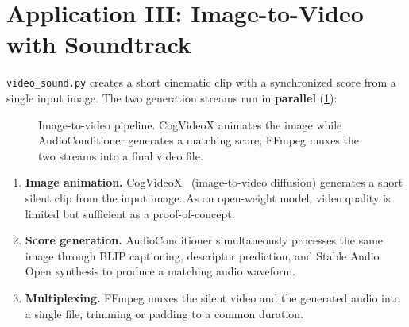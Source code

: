 \documentclass[10pt,twocolumn,letterpaper]{article}
\begin{document}
\section{Application III: Image-to-Video with Soundtrack}
\label{app:video}

\texttt{video\_sound.py} creates a short cinematic clip with a synchronized score from a single input image.
The two generation streams run in \textbf{parallel} (\cref{fig:video_pipeline}):

\begin{figure}[h]
\centering
{}
\caption{Image-to-video pipeline. CogVideoX animates the image while
AudioConditioner generates a matching score; FFmpeg muxes the two streams
into a final video file.}
\label{fig:video_pipeline}
\end{figure}

\begin{enumerate}
  \item \textbf{Image animation.} CogVideoX~\cite{yang2024cogvideox} (image-to-video diffusion) generates a short silent clip from the input image. As an open-weight model, video quality is limited but sufficient as a proof-of-concept.
  \item \textbf{Score generation.} AudioConditioner simultaneously processes the same image through BLIP captioning, descriptor prediction, and Stable Audio Open synthesis to produce a matching audio waveform.
  \item \textbf{Multiplexing.} FFmpeg muxes the silent video and the generated audio into a single file, trimming or padding to a common duration.
\end{enumerate}
\end{document}
